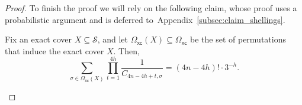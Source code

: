 \documentclass[11pt]{amsart}
\newcommand{\omsh}{\Omega_{\mathsf{sh}}}
\newcommand{\omxc}{\Omega_{\mathsf{xc}}}
\begin{document}
\begin{proof}
To finish the proof we will rely on the following claim, whose proof uses a probabilistic argument and is deferred to~Appendix~\ref{subsec:claim_shellings}.
\begin{claim}\label{claim:omega-xc}
Fix an exact cover $X \subseteq \mathcal{S}$, and let $\omxc(X) \subseteq \omxc$ be the set of permutations that induce the exact cover $X$. Then,
    \[
\sum_{\sigma \in\omxc(X)} \prod_{t=1}^{4h} \frac{1}{C_{4n-4h+t, \sigma}} = (4n-4h)! \cdot 3^{-h}.
\]
\end{claim}
%
%

\end{proof}
\end{document}
